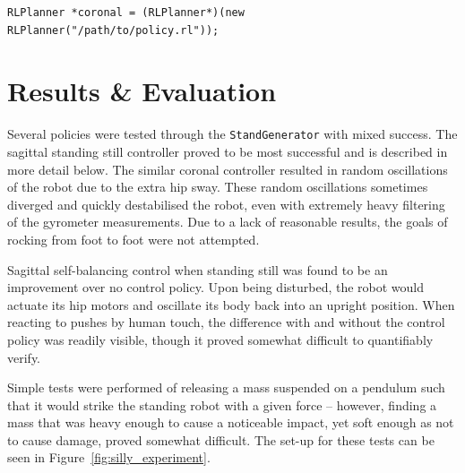 \begin{lstlisting}
RLPlanner *coronal = (RLPlanner*)(new RLPlanner("/path/to/policy.rl"));
\end{lstlisting}

\newpage
\section{Results \& Evaluation}
\label{sec:rl_results}
Several policies were tested through the \texttt{StandGenerator} with mixed success. The sagittal standing still controller proved to be most successful and is described in more detail below. The similar coronal controller resulted in random oscillations of the robot due to the extra hip sway. These random oscillations sometimes diverged and quickly destabilised the robot, even with extremely heavy filtering of the gyrometer measurements. Due to a lack of reasonable results, the goals of rocking from foot to foot were not attempted.

Sagittal self-balancing control when standing still was found to be an improvement over no control policy. Upon being disturbed, the robot would actuate its hip motors and oscillate its body back into an upright position. When reacting to pushes by human touch, the difference with and without the control policy was readily visible, though it proved somewhat difficult to quantifiably verify. 

Simple tests were performed of releasing a mass suspended on a pendulum such that it would strike the standing robot with a given force -- however, finding a mass that was heavy enough to cause a noticeable impact, yet soft enough as not to cause damage, proved somewhat difficult. The set-up for these tests can be seen in Figure~\ref{fig:silly_experiment}.

